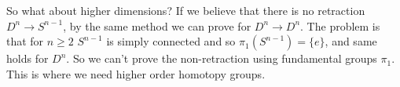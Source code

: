   So what about higher dimensions? If we believe that there is no retraction $D^n \to S^{n-1}$, by the same method we can prove for $D^n \to D^n$. The problem is that for $n \geq 2$ $S^{n-1}$ is simply connected and so $\pi_1(S^{n-1}) = \{e\}$, and same holds for $D^n$. So we can't prove the non-retraction using fundamental groups $\pi_1$. This is where we need higher order homotopy groups. 

